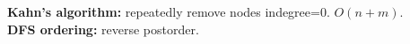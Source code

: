 \textbf{Kahn’s algorithm:} repeatedly remove nodes indegree=0. $O(n+m)$. \\[1mm]
\textbf{DFS ordering:} reverse postorder. \\[1mm]
